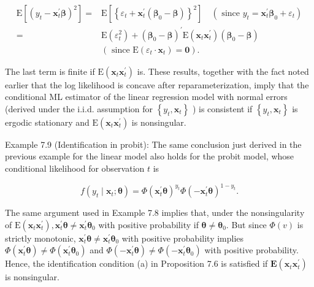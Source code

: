 \documentclass[10pt]{article}
\begin{document}
$$
\begin{aligned}
\mathrm{E}\left[\left(y_{t}-\mathbf{x}_{t}^{\prime} \boldsymbol{\beta}\right)^{2}\right]= & \mathrm{E}\left[\left\{\varepsilon_{t}+\mathbf{x}_{t}^{\prime}\left(\boldsymbol{\beta}_{0}-\boldsymbol{\beta}\right)\right\}^{2}\right] \quad\left(\text { since } y_{t}=\mathbf{x}_{t}^{\prime} \boldsymbol{\beta}_{0}+\varepsilon_{t}\right) \\
= & \mathrm{E}\left(\varepsilon_{t}^{2}\right)+\left(\boldsymbol{\beta}_{0}-\boldsymbol{\beta}\right)^{\prime} \mathrm{E}\left(\mathbf{x}_{t} \mathbf{x}_{t}^{\prime}\right)\left(\boldsymbol{\beta}_{0}-\boldsymbol{\beta}\right) \\
& \left(\text { since } \mathrm{E}\left(\varepsilon_{t} \cdot \mathbf{x}_{t}\right)=\mathbf{0}\right) .
\end{aligned}
$$

The last term is finite if $\mathrm{E}\left(\mathbf{x}_{t} \mathbf{x}_{t}^{\prime}\right)$ is. These results, together with the fact noted earlier that the log likelihood is concave after reparameterization, imply that the conditional ML estimator of the linear regression model with normal errors (derived under the i.i.d. assumption for $\left\{y_{t}, \mathbf{x}_{t}\right\}$ ) is consistent if $\left\{y_{t}, \mathbf{x}_{t}\right\}$ is ergodic stationary and $\mathrm{E}\left(\mathbf{x}_{t} \mathbf{x}_{t}^{\prime}\right)$ is nonsingular.

Example 7.9 (Identification in probit): The same conclusion just derived in the previous example for the linear model also holds for the probit model, whose conditional likelihood for observation $t$ is

$$
f\left(y_{t} \mid \mathbf{x}_{t} ; \boldsymbol{\theta}\right)=\Phi\left(\mathbf{x}_{t}^{\prime} \boldsymbol{\theta}\right)^{y_{t}} \Phi\left(-\mathbf{x}_{t}^{\prime} \boldsymbol{\theta}\right)^{1-y_{t}} .
$$

The same argument used in Example 7.8 implies that, under the nonsingularity of $\mathrm{E}\left(\mathbf{x}_{t} \mathbf{x}_{t}^{\prime}\right), \mathbf{x}_{t}^{\prime} \boldsymbol{\theta} \neq \mathbf{x}_{t}^{\prime} \boldsymbol{\theta}_{0}$ with positive probability if $\boldsymbol{\theta} \neq \boldsymbol{\theta}_{0}$. But since $\Phi(v)$ is strictly monotonic, $\mathbf{x}_{t}^{\prime} \boldsymbol{\theta} \neq \mathbf{x}_{t}^{\prime} \boldsymbol{\theta}_{0}$ with positive probability implies $\Phi\left(\mathbf{x}_{t}^{\prime} \boldsymbol{\theta}\right) \neq \Phi\left(\mathbf{x}_{t}^{\prime} \boldsymbol{\theta}_{0}\right)$ and $\Phi\left(-\mathbf{x}_{t}^{\prime} \boldsymbol{\theta}\right) \neq \Phi\left(-\mathbf{x}_{t}^{\prime} \boldsymbol{\theta}_{0}\right)$ with positive probability. Hence, the identification condition (a) in Proposition 7.6 is satisfied if $\mathbf{E}\left(\mathbf{x}_{t} \mathbf{x}_{t}^{\prime}\right)$ is nonsingular.
\end{document}
